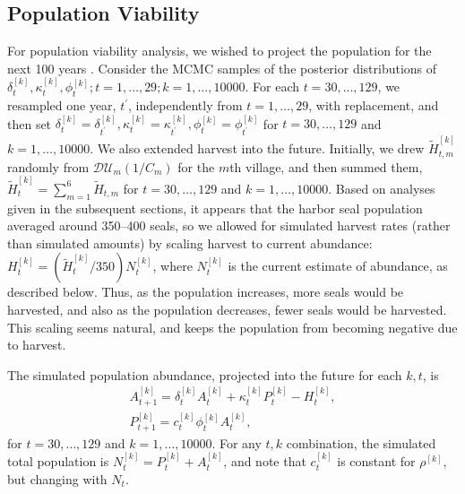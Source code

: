 \documentclass[12pt, titlepage]{article}\usepackage[]{graphicx}\usepackage[]{color}
\def\upp{^{\prime}}
\begin{document}

\subsection{Population Viability} \label{sec:PVA}

For population viability analysis, we wished to project the population for the next 100 years \citep[e.g.][]{Ver:popu:2002}. Consider the MCMC samples of the posterior distributions of $\delta^{[k]}_{t}, \kappa^{[k]}_t, \phi^{[k]}_t; t = 1,\ldots,29; k = 1,\ldots,10000$. For each $t = 30,\ldots,129$, we resampled one year, $t\upp$, independently from $t = 1,\ldots,29$, with replacement, and then set $\delta^{[k]}_{t} = \delta^{[k]}_{t\upp}, \kappa^{[k]}_t = \kappa^{[k]}_{t\upp}, \phi^{[k]}_t = \phi^{[k]}_{t\upp}$ for $t = 30,\ldots,129$ and $k = 1,\ldots,10000$.  We also extended harvest into the future.  Initially, we drew $\tilde{H}_{t,m}^{[k]}$ randomly from $\mathcal{DU}_m(1/C_m)$ for the $m$th village, and then summed them, $\tilde{H}_t^{[k]} = \sum_{m=1}^6 \tilde{H}_{t,m}$ for $t = 30,\ldots,129$ and $k = 1,\ldots,10000$. Based on analyses given in the subsequent sections, it appears that the harbor seal population averaged around 350--400 seals, so we allowed for simulated harvest rates (rather than simulated amounts) by scaling harvest to current abundance: $H_t^{[k]} = (\tilde{H}_t^{[k]}/350)N_t^{[k]}$, where $N_t^{[k]}$ is the current estimate of abundance, as described below.  Thus, as the population increases, more seals would be harvested, and also as the population decreases, fewer seals would be harvested.  This scaling seems natural, and keeps the population from becoming negative due to harvest. 

The simulated population abundance, projected into the future for each $k,t$, is 
\[
  \begin{array}{l}
		A^{[k]}_{t+1} = \delta^{[k]}_{t}A^{[k]}_t + \kappa^{[k]}_{t} P^{[k]}_t - H^{[k]}_{t}, \\
		P^{[k]}_{t+1} = c^{[k]}_t\phi^{[k]}_t A^{[k]}_t,
  \end{array}
\]
for $t = 30,\ldots,129$ and $k = 1,\ldots,10000$. For any $t,k$ combination, the simulated total population is $N_t^{[k]} = P_t^{[k]} + A_t^{[k]}$, and note that $c^{[k]}_t$ is constant for $\rho^{[k]}$, but changing with $N_t$.
\end{document}
